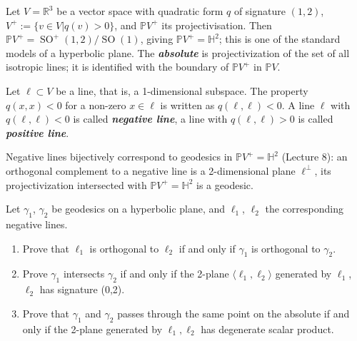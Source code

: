 \documentclass{article}
\newcommand{\R}{\mathbb{R}}
\renewcommand{\P}{\mathbb{P}}
\renewcommand{\H}{\mathbb{H}}
\DeclareMathOperator{\SO}{SO}
\begin{document}
\begin{remark}
	Let $V = \R^3$ be a vector space with quadratic form $q$ of signature $(1,2)$, $V^+:=\{v\in V|q(v)>0\}$, and $\P V^+$ its projectivisation. Then $\P V^+=\SO^+(1,2)/\SO(1)$, giving $\P V^+= \H^2$; this is one of the standard models of a hyperbolic plane. The \textbf{\textit{absolute}} is projectivization of the set of all isotropic lines; it is identified with the boundary of $\P V^+$ in $\P V$.
\end{remark}
\begin{defn}
	Let $\ell \subset V$ be a line, that is, a 1-dimensional subspace. The property $q(x,x)<0$ for a non-zero $x\in\ell$ is written as $q(\ell,\ell)<0$. A line $\ell$ with $q(\ell,\ell)<0$ is called \textbf{\textit{negative line}}, a line with $q(\ell,\ell) > 0$ is called \textbf{\textit{positive line}}.
\end{defn}
\begin{remark}
	Negative lines bijectively correspond to geodesics in $\P V^+ = \H^2$ (Lecture 8): an orthogonal complement to a negative line is a 2-dimensional plane $\ell^\perp$, its projectivization intersected with $\P V^+ = \H^2$ is a geodesic.
\end{remark}
\begin{exercise}
	 Let $\gamma_1$, $\gamma_2$ be geodesics on a hyperbolic plane, and $\ell_1$, $\ell_2$ the corresponding negative lines.
\end{exercise}
\begin{enumerate}[label*=\alph*.]
	\item Prove that $\ell_1$ is orthogonal to $\ell_2$ if and only if $\gamma_1$ is orthogonal to $\gamma_2$.
	\item Prove $\gamma_1$ intersects $\gamma_2$ if and only if the 2-plane $\langle\ell_1,\ell_2\rangle$ generated by $\ell_1$, $\ell_2$ has
	signature (0,2).
	
	\item Prove that $\gamma_1$ and $\gamma_2$ passes through the same point on the absolute if and only if
	the 2-plane generated by $\ell_1,\ell_2$ has degenerate scalar product.
	
\end{enumerate}
\end{document}
